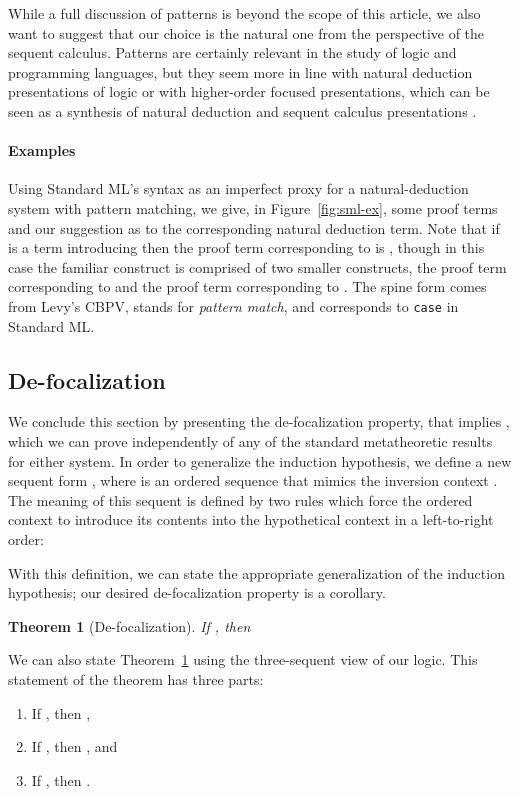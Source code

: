 \documentclass[acmtocl]{robtrans}\pdfoutput=1
\newtheorem{theorem}{Theorem}
\begin{document}
While a full discussion of patterns is
beyond the scope of this article, we also want to suggest that our
choice is the natural one from the perspective of the sequent
calculus. Patterns are certainly relevant in the study of logic and
programming languages, but they seem more in line with natural
deduction presentations of logic or with higher-order focused
presentations, which can be seen as a synthesis of natural deduction
and sequent calculus presentations
\cite{zeilberger09logical,brock10focused}.

\paragraph*{Examples}
Using Standard ML's syntax as an imperfect proxy for a
natural-deduction system with pattern matching, we give, in
Figure~\ref{fig:sml-ex}, some proof terms and our suggestion as to the
corresponding natural deduction term. Note that if  is a term
introducing  then the proof term corresponding to
 is , though in this
case the familiar construct is comprised of two smaller constructs,
the proof term corresponding to  and the proof term
corresponding to . The spine form  comes
from Levy's CBPV, stands for {\it pattern match}, and corresponds to
\verb'case' in Standard ML.



\subsection{De-focalization}\label{sec:soundness}

We conclude this section by presenting the de-focalization property,
that  implies
, which we can prove independently
of any of the standard metatheoretic results for either system.
In order to generalize the induction hypothesis, we define
a new sequent form , where  is an ordered sequence 
that mimics the inversion context . The meaning of this 
sequent is defined
by two rules which force the ordered  context to introduce its contents
into the hypothetical context  in a left-to-right order:


With this definition, we can state the appropriate generalization of
the induction hypothesis; our desired de-focalization property is a
corollary.

\begin{theorem}[De-focalization]\label{thm:soundness}
If , then 
   
\end{theorem}
We can also state Theorem~\ref{thm:soundness} using the three-sequent
view of our logic. This statement of the theorem has three parts:
\begin{enumerate}
\item If ,
      then ,
\item If ,
      then , and
\item If , 
      then .
\end{enumerate}
\end{document}
